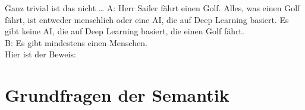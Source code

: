 \begin{frame}
  {Ganz trivial ist das nicht \ldots}
  \onslide<+->
  \onslide<+->
    A: Herr Sailer fährt einen Golf. Alles, was einen Golf fährt, ist entweder menschlich oder eine AI, die auf Deep Learning basiert. Es gibt keine AI, die auf Deep Learning basiert, die einen Golf fährt.\\
    \alert{B: Es gibt mindestens einen Menschen.}\\
    \onslide<+->
    \Halbzeile
    Hier ist der Beweis:\\
    \onslide<+->
    \Halbzeile
    \centering
\end{frame}

\section{Grundfragen der Semantik}

